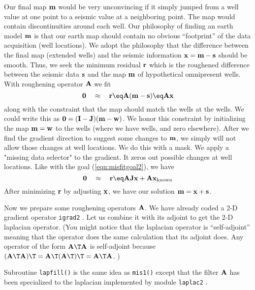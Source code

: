 \par
Our final map $\bold m$ would be very unconvincing if
it simply jumped from a well value at one point
to a seismic value at a neighboring point.
The map would contain discontinuities around each well.
Our philosophy of finding an earth model $\bold m$
is that our earth map should contain no obvious 
``footprint'' of the data acquisition (well locations).
We adopt the philosophy that the difference
between the final map (extended wells)
and the seismic information $\bold x=\bold m-\bold s$ should be smooth.
Thus,
we seek the minimum residual $\bold r$
which is the roughened difference between the seismic data $\bold s$
and the map $\bold m$ of hypothetical omnipresent wells.
With roughening operator $\bold A$ we fit
\begin{equation}
\bold 0\quad\approx\quad \bold r \eq \bold A ( \bold m - \bold s )
	\eq \bold A \bold x
\label{eqn:unconmap}
\end{equation}
along with the constraint
that the map should match the wells at the wells.
We could write this as
$\bold 0 = (\bold I-\bold J) ( \bold m - \bold w )$.
We honor this constraint by initializing the map $\bold m = \bold w$
to the wells (where we have wells, and zero elsewhere).
After we find the gradient direction to suggest some changes
to $\bold m$, we simply will not allow those changes at well locations.
We do this with a mask.
We apply a "missing data selector" to the gradient.
It zeros out possible changes at well locations.
Like with the goal (\ref{eqn:misfitgoal2}),
we have
\begin{equation}
\bold 0\quad\approx\quad \bold r \eq
\bold A \bold J \bold x + \bold A \bold x_{\rm known}
\end{equation}
After minimizing $\bold r$ by adjusting $\bold x$,
we have our solution $ \bold m =  \bold x + \bold s $.

\par
Now we prepare some roughening operators $\bold A$.
We have already coded a 2-D gradient operator
\texttt{igrad2} .
Let us combine it with its adjoint to get the 2-D laplacian operator.
(You might notice that the laplacian operator is ``self-adjoint'' meaning
that the operator does the same calculation that its adjoint does.
Any operator of the form $\bold A\T\bold A$ is self-adjoint because
$(\bold A\T\bold A)\T=\bold A\T (\bold A\T)\T=\bold A\T\bold A$. )
\par
{} 
Subroutine \texttt{lapfill()}
 is the same idea as \texttt{mis1()}
 except that 
the filter $\bold A$ has been specialized to the 
laplacian
implemented by module \texttt{laplac2} . 


